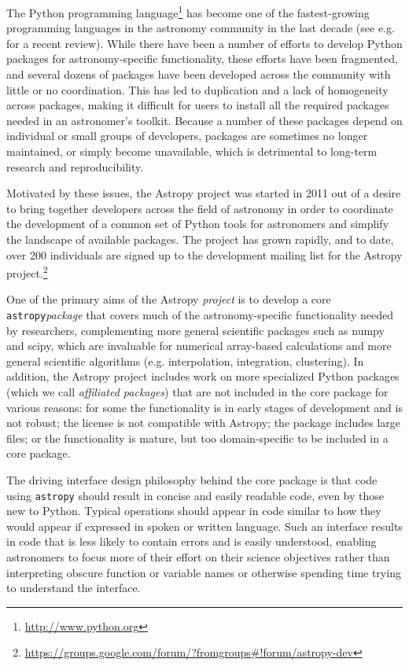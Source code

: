 \documentclass[traditabstract]{aa}
\newcommand{\astropy}{\texttt{astropy}\xspace}
\begin{document}
The Python programming language\footnote{\url{http://www.python.org}} has become
one of the fastest-growing programming languages in the astronomy community in
the last decade (see e.g. \citealt{greenfield11} for a recent review). While there have been a number of efforts to develop Python
packages for astronomy-specific functionality, these efforts have been
fragmented, and several dozens of packages have been developed across the
community with little or no coordination. This has led to duplication and a
lack of homogeneity across packages, making it difficult for users to install
all the required packages needed in an astronomer's toolkit. Because a number
of these packages depend on individual or small groups of developers, packages
are sometimes no longer maintained, or simply become unavailable, which is
detrimental to long-term research and reproducibility.

Motivated by these issues, the Astropy project was started in
2011 out of a desire to bring
together developers across the field of astronomy in order to coordinate the
development of a common set of Python tools for astronomers and
simplify the landscape of available packages. The project has grown rapidly,
and to date, over 200 individuals are signed up to the development mailing list for
the Astropy project.\footnote{
\url{https://groups.google.com/forum/?fromgroups#!forum/astropy-dev}}

One of the primary aims of the Astropy \textit{project} is to develop a core
\astropy \textit{package} that covers much of the astronomy-specific
functionality needed by researchers, complementing more general scientific
packages such as \gls{numpy} and \gls{scipy}, which are invaluable for
numerical array-based calculations and more general scientific algorithms (e.g.
interpolation, integration, clustering). In addition, the Astropy project
includes work on more specialized Python packages (which we call
\textit{affiliated packages}) that are not included in the core package for
various reasons: for some the functionality is in early stages of development
and is not robust; the license is not compatible with Astropy; the package
includes large files; or the functionality is mature, but too domain-specific
to be included in a core package.

The driving interface design philosophy behind the core package is that code
using \astropy should result in concise and easily readable code, even by those new to
Python. Typical operations should appear in code similar to how they would
appear if expressed in spoken or written language. Such an interface results in
code that is less likely to contain errors and is easily understood, enabling
astronomers to focus more of their effort on their science objectives rather
than interpreting obscure function or variable names or otherwise spending time
trying to understand the interface.
\end{document}
